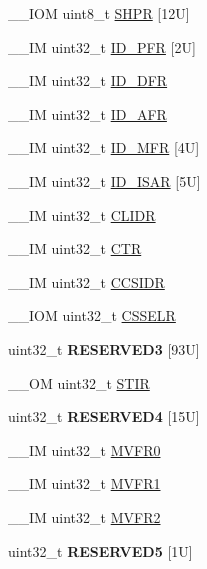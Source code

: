 \begin{DoxyCompactItemize}
\item 
\-\_\-\-\_\-\-I\-O\-M uint8\-\_\-t \hyperlink{struct_s_c_b___type_afdab23abd301033bb318c7b188b377db}{S\-H\-P\-R} \mbox{[}12\-U\mbox{]}
\item 
\-\_\-\-\_\-\-I\-M uint32\-\_\-t \hyperlink{struct_s_c_b___type_ab35c6b650d3bb2d11259c0a0285d0d00}{I\-D\-\_\-\-P\-F\-R} \mbox{[}2\-U\mbox{]}
\item 
\-\_\-\-\_\-\-I\-M uint32\-\_\-t \hyperlink{struct_s_c_b___type_ada1d3119c020983fdc949c2ccd406caa}{I\-D\-\_\-\-D\-F\-R}
\item 
\-\_\-\-\_\-\-I\-M uint32\-\_\-t \hyperlink{struct_s_c_b___type_a9c9a1d805f8e99b9fd3ab4f455b6333a}{I\-D\-\_\-\-A\-F\-R}
\item 
\-\_\-\-\_\-\-I\-M uint32\-\_\-t \hyperlink{struct_s_c_b___type_a781ef24d88610a432e7d5b179d78de47}{I\-D\-\_\-\-M\-F\-R} \mbox{[}4\-U\mbox{]}
\item 
\-\_\-\-\_\-\-I\-M uint32\-\_\-t \hyperlink{struct_s_c_b___type_ac729a357cdd968020fdb5c35bdfc4916}{I\-D\-\_\-\-I\-S\-A\-R} \mbox{[}5\-U\mbox{]}
\item 
\-\_\-\-\_\-\-I\-M uint32\-\_\-t \hyperlink{struct_s_c_b___type_ad9899f5775251cf5ef0cb0845527afc2}{C\-L\-I\-D\-R}
\item 
\-\_\-\-\_\-\-I\-M uint32\-\_\-t \hyperlink{struct_s_c_b___type_af3fe705fef8762763b6d61dbdf0ccc3d}{C\-T\-R}
\item 
\-\_\-\-\_\-\-I\-M uint32\-\_\-t \hyperlink{struct_s_c_b___type_afd063c9297a1a3b67e6d1d5e179e6a0e}{C\-C\-S\-I\-D\-R}
\item 
\-\_\-\-\_\-\-I\-O\-M uint32\-\_\-t \hyperlink{struct_s_c_b___type_ad3884e8b6504ec63c1eaa8742e94df3d}{C\-S\-S\-E\-L\-R}
\item 
\hypertarget{struct_s_c_b___type_aa55deef9278aed6826d5e1ae199a0d23}{uint32\-\_\-t {\bfseries R\-E\-S\-E\-R\-V\-E\-D3} \mbox{[}93\-U\mbox{]}}\label{struct_s_c_b___type_aa55deef9278aed6826d5e1ae199a0d23}

\item 
\-\_\-\-\_\-\-O\-M uint32\-\_\-t \hyperlink{struct_s_c_b___type_ad70825dd0869b7ccd07fb2b8680fcdb6}{S\-T\-I\-R}
\item 
\hypertarget{struct_s_c_b___type_a4819f7ad316c10a458cd3a7ac86cbbee}{uint32\-\_\-t {\bfseries R\-E\-S\-E\-R\-V\-E\-D4} \mbox{[}15\-U\mbox{]}}\label{struct_s_c_b___type_a4819f7ad316c10a458cd3a7ac86cbbee}

\item 
\-\_\-\-\_\-\-I\-M uint32\-\_\-t \hyperlink{struct_s_c_b___type_a7a1ba0f875c0e97c1673882b1106e66b}{M\-V\-F\-R0}
\item 
\-\_\-\-\_\-\-I\-M uint32\-\_\-t \hyperlink{struct_s_c_b___type_a75d6299150fdcbbcb765e22ff27c432e}{M\-V\-F\-R1}
\item 
\-\_\-\-\_\-\-I\-M uint32\-\_\-t \hyperlink{struct_s_c_b___type_a280ef961518ecee3ed43a86404853c3d}{M\-V\-F\-R2}
\item 
\hypertarget{struct_s_c_b___type_a82b68e5bbea29a5b307c22bca9332a0f}{uint32\-\_\-t {\bfseries R\-E\-S\-E\-R\-V\-E\-D5} \mbox{[}1\-U\mbox{]}}\label{struct_s_c_b___type_a82b68e5bbea29a5b307c22bca9332a0f}


\end{DoxyCompactItemize}
